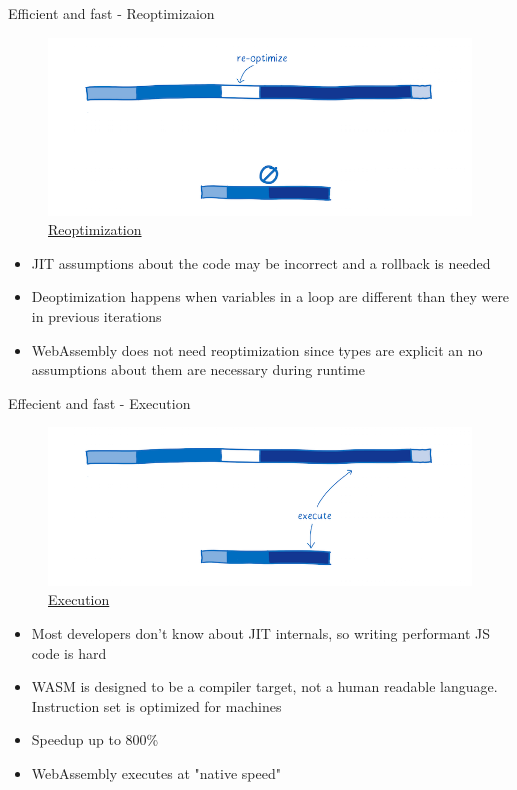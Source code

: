 \documentclass{beamer}
\begin{document}
\begin{frame}{Efficient and fast - Reoptimizaion}
      \begin{figure}
        \includegraphics[scale=0.2]{./images/re-optimize.png}
        \caption{\href{https://www.smashingmagazine.com/2017/05/abridged-cartoon-introduction-webassembly/}{Reoptimization}}
    \end{figure}
\begin{itemize}
    \item JIT assumptions about the code may be incorrect and a rollback is needed
    \item Deoptimization happens when variables in a loop are different than they were in previous iterations
    \item WebAssembly does not need reoptimization since types are explicit an no assumptions about them are necessary during runtime
\end{itemize}
\end{frame}

\begin{frame}{Effecient and fast - Execution}
   \begin{figure}
        \includegraphics[scale=0.2]{./images/execution.png}
        \caption{\href{https://www.smashingmagazine.com/2017/05/abridged-cartoon-introduction-webassembly/}{Execution}}
    \end{figure} 
    \begin{itemize}
        \item Most developers don't know about JIT internals, so writing performant JS code is hard
        \item WASM is designed to be a compiler target, not a human readable language. Instruction set is optimized for machines
        \item Speedup up to 800\% 
        \item WebAssembly executes at "native speed"
    \end{itemize}
\end{frame}
\end{document}
